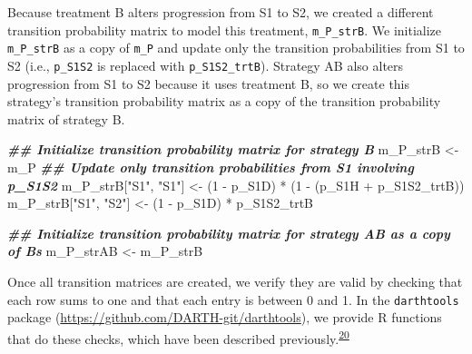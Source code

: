 \documentclass[
]{article}
\newenvironment{Shaded}{\begin{snugshade}}{\end{snugshade}}
\newcommand{\DecValTok}[1]{\textcolor[rgb]{0.00,0.00,0.81}{#1}}
\newcommand{\DocumentationTok}[1]{\textcolor[rgb]{0.56,0.35,0.01}{\textbf{\textit{#1}}}}
\newcommand{\NormalTok}[1]{#1}
\newcommand{\OtherTok}[1]{\textcolor[rgb]{0.56,0.35,0.01}{#1}}
\newcommand{\SpecialCharTok}[1]{\textcolor[rgb]{0.00,0.00,0.00}{#1}}
\newcommand{\StringTok}[1]{\textcolor[rgb]{0.31,0.60,0.02}{#1}}
\begin{document}
Because treatment B alters progression from S1 to S2, we created a different transition probability matrix to model this treatment, \texttt{m\_P\_strB}. We initialize \texttt{m\_P\_strB} as a copy of \texttt{m\_P} and update only the transition probabilities from S1 to S2 (i.e., \texttt{p\_S1S2} is replaced with \texttt{p\_S1S2\_trtB}). Strategy AB also alters progression from S1 to S2 because it uses treatment B, so we create this strategy's transition probability matrix as a copy of the transition probability matrix of strategy B.

\begin{Shaded}
\begin{Highlighting}[]
\DocumentationTok{\#\# Initialize transition probability matrix for strategy B}
\NormalTok{m\_P\_strB }\OtherTok{\textless{}{-}}\NormalTok{ m\_P}
\DocumentationTok{\#\# Update only transition probabilities from S1 involving p\_S1S2}
\NormalTok{m\_P\_strB[}\StringTok{"S1"}\NormalTok{, }\StringTok{"S1"}\NormalTok{] }\OtherTok{\textless{}{-}}\NormalTok{ (}\DecValTok{1} \SpecialCharTok{{-}}\NormalTok{ p\_S1D) }\SpecialCharTok{*}\NormalTok{ (}\DecValTok{1} \SpecialCharTok{{-}}\NormalTok{ (p\_S1H }\SpecialCharTok{+}\NormalTok{ p\_S1S2\_trtB))}
\NormalTok{m\_P\_strB[}\StringTok{"S1"}\NormalTok{, }\StringTok{"S2"}\NormalTok{] }\OtherTok{\textless{}{-}}\NormalTok{ (}\DecValTok{1} \SpecialCharTok{{-}}\NormalTok{ p\_S1D) }\SpecialCharTok{*}\NormalTok{ p\_S1S2\_trtB}

\DocumentationTok{\#\# Initialize transition probability matrix for strategy AB as a copy of B\textquotesingle{}s}
\NormalTok{m\_P\_strAB }\OtherTok{\textless{}{-}}\NormalTok{ m\_P\_strB}
\end{Highlighting}
\end{Shaded}

Once all transition matrices are created, we verify they are valid by checking that each row sums to one and that each entry is between 0 and 1. In the \texttt{darthtools} package (\url{https://github.com/DARTH-git/darthtools}), we provide R functions that do these checks, which have been described previously.\textsuperscript{\protect\hyperlink{ref-Alarid-Escudero2019e}{20}}
\end{document}
